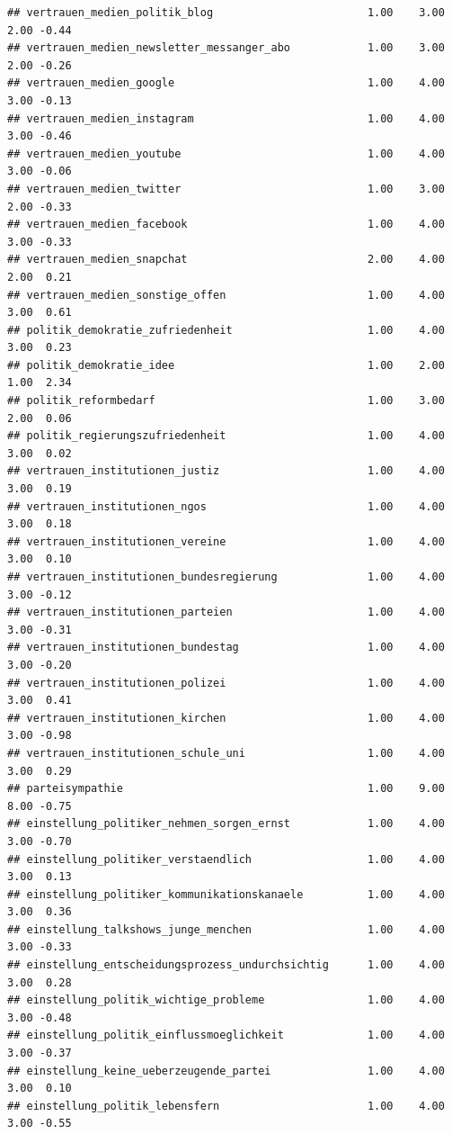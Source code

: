 \documentclass[
]{book}
\begin{document}
\begin{verbatim}
## vertrauen_medien_politik_blog                        1.00    3.00    2.00 -0.44
## vertrauen_medien_newsletter_messanger_abo            1.00    3.00    2.00 -0.26
## vertrauen_medien_google                              1.00    4.00    3.00 -0.13
## vertrauen_medien_instagram                           1.00    4.00    3.00 -0.46
## vertrauen_medien_youtube                             1.00    4.00    3.00 -0.06
## vertrauen_medien_twitter                             1.00    3.00    2.00 -0.33
## vertrauen_medien_facebook                            1.00    4.00    3.00 -0.33
## vertrauen_medien_snapchat                            2.00    4.00    2.00  0.21
## vertrauen_medien_sonstige_offen                      1.00    4.00    3.00  0.61
## politik_demokratie_zufriedenheit                     1.00    4.00    3.00  0.23
## politik_demokratie_idee                              1.00    2.00    1.00  2.34
## politik_reformbedarf                                 1.00    3.00    2.00  0.06
## politik_regierungszufriedenheit                      1.00    4.00    3.00  0.02
## vertrauen_institutionen_justiz                       1.00    4.00    3.00  0.19
## vertrauen_institutionen_ngos                         1.00    4.00    3.00  0.18
## vertrauen_institutionen_vereine                      1.00    4.00    3.00  0.10
## vertrauen_institutionen_bundesregierung              1.00    4.00    3.00 -0.12
## vertrauen_institutionen_parteien                     1.00    4.00    3.00 -0.31
## vertrauen_institutionen_bundestag                    1.00    4.00    3.00 -0.20
## vertrauen_institutionen_polizei                      1.00    4.00    3.00  0.41
## vertrauen_institutionen_kirchen                      1.00    4.00    3.00 -0.98
## vertrauen_institutionen_schule_uni                   1.00    4.00    3.00  0.29
## parteisympathie                                      1.00    9.00    8.00 -0.75
## einstellung_politiker_nehmen_sorgen_ernst            1.00    4.00    3.00 -0.70
## einstellung_politiker_verstaendlich                  1.00    4.00    3.00  0.13
## einstellung_politiker_kommunikationskanaele          1.00    4.00    3.00  0.36
## einstellung_talkshows_junge_menchen                  1.00    4.00    3.00 -0.33
## einstellung_entscheidungsprozess_undurchsichtig      1.00    4.00    3.00  0.28
## einstellung_politik_wichtige_probleme                1.00    4.00    3.00 -0.48
## einstellung_politik_einflussmoeglichkeit             1.00    4.00    3.00 -0.37
## einstellung_keine_ueberzeugende_partei               1.00    4.00    3.00  0.10
## einstellung_politik_lebensfern                       1.00    4.00    3.00 -0.55

\end{verbatim}
\end{document}
